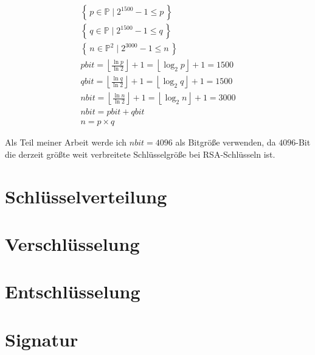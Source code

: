 \begin{align}
  \left\{\,p \in \mathbb{P}\mid 2^{1500}-1 \le p\, \right\}\\
  \left\{\,q \in \mathbb{P}\mid 2^{1500}-1 \le q\, \right\}\\
  \left\{\,n \in \mathbb{P}^2\mid 2^{3000}-1 \le n\, \right\}\\
  pbit=\left\lfloor\frac{\ln{p}}{\ln{2}}\right\rfloor+1=\left\lfloor\log_2{p}\right\rfloor+1=1500\\
  qbit=\left\lfloor\frac{\ln{q}}{\ln{2}}\right\rfloor+1=\left\lfloor\log_2{q}\right\rfloor+1=1500\\
  nbit=\left\lfloor\frac{\ln{n}}{\ln{2}}\right\rfloor+1=\left\lfloor\log_2{n}\right\rfloor+1=3000\\
  nbit=pbit+qbit\\
  n=p \times q
\end{align}

Als Teil meiner Arbeit werde ich $nbit=4096$ als Bitgröße verwenden, da $4096$-Bit die derzeit größte weit verbreitete Schlüsselgröße bei RSA-Schlüsseln ist.

\newpage
\section{Schlüsselverteilung}
\newpage
\section{Verschlüsselung}
\newpage
\section{Entschlüsselung}
\newpage
\section{Signatur}
